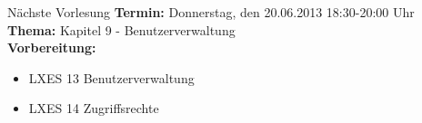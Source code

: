 \documentclass[aspectratio=43]{beamer}
\begin{document}
\begin{frame}[plain]
  \begin{alertblock}{Nächste Vorlesung}
    \textbf{Termin:} Donnerstag, den 20.06.2013 18:30-20:00 Uhr\\
    \textbf{Thema:} Kapitel 9 - Benutzerverwaltung \\
    \textbf{Vorbereitung:} 
    \begin{itemize}
      \item LXES 13 Benutzerverwaltung
      \item LXES 14 Zugriffsrechte
    \end{itemize}
  \end{alertblock}
\end{frame}



\materialframe
\end{document}
